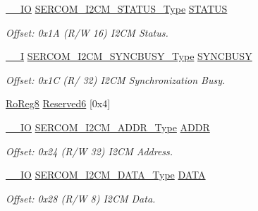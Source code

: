 \begin{DoxyCompactItemize}
\item 
\mbox{\hyperlink{core__cm0plus_8h_aec43007d9998a0a0e01faede4133d6be}{\+\_\+\+\_\+\+IO}} \mbox{\hyperlink{union_s_e_r_c_o_m___i2_c_m___s_t_a_t_u_s___type}{S\+E\+R\+C\+O\+M\+\_\+\+I2\+C\+M\+\_\+\+S\+T\+A\+T\+U\+S\+\_\+\+Type}} \mbox{\hyperlink{struct_sercom_i2cm_a7c99708815eb51264100fe0081bed598}{S\+T\+A\+T\+US}}
\begin{DoxyCompactList}\small\item\em Offset\+: 0x1A (R/W 16) I2\+CM Status. \end{DoxyCompactList}\item 
\mbox{\hyperlink{core__cm0plus_8h_af63697ed9952cc71e1225efe205f6cd3}{\+\_\+\+\_\+I}} \mbox{\hyperlink{union_s_e_r_c_o_m___i2_c_m___s_y_n_c_b_u_s_y___type}{S\+E\+R\+C\+O\+M\+\_\+\+I2\+C\+M\+\_\+\+S\+Y\+N\+C\+B\+U\+S\+Y\+\_\+\+Type}} \mbox{\hyperlink{struct_sercom_i2cm_accbbe1aa136865ea8fe8c7ee46a1409c}{S\+Y\+N\+C\+B\+U\+SY}}
\begin{DoxyCompactList}\small\item\em Offset\+: 0x1C (R/ 32) I2\+CM Synchronization Busy. \end{DoxyCompactList}\item 
\mbox{\hyperlink{group___s_a_m_d21_e15_a__definitions_ga0d957f1433aaf5d70e4dc2b68288442d}{Ro\+Reg8}} \mbox{\hyperlink{struct_sercom_i2cm_a90ebeceec1a70581f0fc4da2e250e4a6}{Reserved6}} \mbox{[}0x4\mbox{]}
\item 
\mbox{\hyperlink{core__cm0plus_8h_aec43007d9998a0a0e01faede4133d6be}{\+\_\+\+\_\+\+IO}} \mbox{\hyperlink{union_s_e_r_c_o_m___i2_c_m___a_d_d_r___type}{S\+E\+R\+C\+O\+M\+\_\+\+I2\+C\+M\+\_\+\+A\+D\+D\+R\+\_\+\+Type}} \mbox{\hyperlink{struct_sercom_i2cm_a68e13b8e9b88cba0314a06023a08be3d}{A\+D\+DR}}
\begin{DoxyCompactList}\small\item\em Offset\+: 0x24 (R/W 32) I2\+CM Address. \end{DoxyCompactList}\item 
\mbox{\hyperlink{core__cm0plus_8h_aec43007d9998a0a0e01faede4133d6be}{\+\_\+\+\_\+\+IO}} \mbox{\hyperlink{union_s_e_r_c_o_m___i2_c_m___d_a_t_a___type}{S\+E\+R\+C\+O\+M\+\_\+\+I2\+C\+M\+\_\+\+D\+A\+T\+A\+\_\+\+Type}} \mbox{\hyperlink{struct_sercom_i2cm_a7d4817db0c66be19ba047d40e1c7f4e5}{D\+A\+TA}}
\begin{DoxyCompactList}\small\item\em Offset\+: 0x28 (R/W 8) I2\+CM Data. \end{DoxyCompactList}\item 

\end{DoxyCompactItemize}

